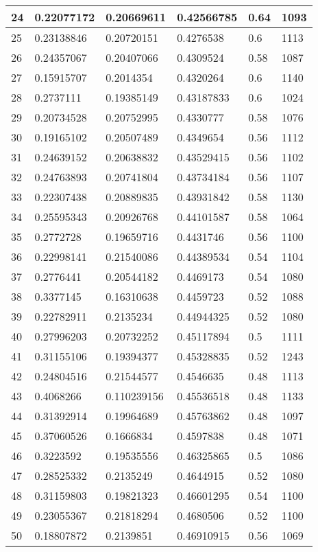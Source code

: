 \begin{longtable}{|l|l|l|l|l|l|}
24 & 0.22077172 & 0.20669611 & 0.42566785 & 0.64 & 1093 \\ \hline 
25 & 0.23138846 & 0.20720151 & 0.4276538 & 0.6 & 1113 \\ \hline 
26 & 0.24357067 & 0.20407066 & 0.4309524 & 0.58 & 1087 \\ \hline 
27 & 0.15915707 & 0.2014354 & 0.4320264 & 0.6 & 1140 \\ \hline 
28 & 0.2737111 & 0.19385149 & 0.43187833 & 0.6 & 1024 \\ \hline 
29 & 0.20734528 & 0.20752995 & 0.4330777 & 0.58 & 1076 \\ \hline 
30 & 0.19165102 & 0.20507489 & 0.4349654 & 0.56 & 1112 \\ \hline 
31 & 0.24639152 & 0.20638832 & 0.43529415 & 0.56 & 1102 \\ \hline 
32 & 0.24763893 & 0.20741804 & 0.43734184 & 0.56 & 1107 \\ \hline 
33 & 0.22307438 & 0.20889835 & 0.43931842 & 0.58 & 1130 \\ \hline 
34 & 0.25595343 & 0.20926768 & 0.44101587 & 0.58 & 1064 \\ \hline 
35 & 0.2772728 & 0.19659716 & 0.4431746 & 0.56 & 1100 \\ \hline 
36 & 0.22998141 & 0.21540086 & 0.44389534 & 0.54 & 1104 \\ \hline 
37 & 0.2776441 & 0.20544182 & 0.4469173 & 0.54 & 1080 \\ \hline 
38 & 0.3377145 & 0.16310638 & 0.4459723 & 0.52 & 1088 \\ \hline 
39 & 0.22782911 & 0.2135234 & 0.44944325 & 0.52 & 1080 \\ \hline 
40 & 0.27996203 & 0.20732252 & 0.45117894 & 0.5 & 1111 \\ \hline 
41 & 0.31155106 & 0.19394377 & 0.45328835 & 0.52 & 1243 \\ \hline 
42 & 0.24804516 & 0.21544577 & 0.4546635 & 0.48 & 1113 \\ \hline 
43 & 0.4068266 & 0.110239156 & 0.45536518 & 0.48 & 1133 \\ \hline 
44 & 0.31392914 & 0.19964689 & 0.45763862 & 0.48 & 1097 \\ \hline 
45 & 0.37060526 & 0.1666834 & 0.4597838 & 0.48 & 1071 \\ \hline 
46 & 0.3223592 & 0.19535556 & 0.46325865 & 0.5 & 1086 \\ \hline 
47 & 0.28525332 & 0.2135249 & 0.4644915 & 0.52 & 1080 \\ \hline 
48 & 0.31159803 & 0.19821323 & 0.46601295 & 0.54 & 1100 \\ \hline 
49 & 0.23055367 & 0.21818294 & 0.4680506 & 0.52 & 1100 \\ \hline 
50 & 0.18807872 & 0.2139851 & 0.46910915 & 0.56 & 1069 \\ \hline 
\end{longtable}